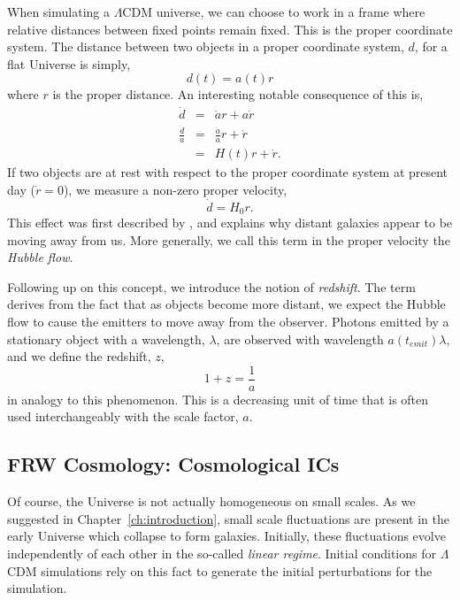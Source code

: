 When simulating a $\Lambda$CDM universe, we can choose to work in a frame where relative distances between fixed points remain fixed. This is the proper coordinate system. The distance between two objects in a proper coordinate system, $d$, for a flat Universe is simply,
\begin{equation}
d(t) = a(t) r \label{eq:comoving_dist}
\end{equation}
where $r$ is the proper distance. An interesting notable consequence of this is,
\begin{eqnarray}
\dot{d} &=& \dot{a} r + a \dot{r} \\
\frac{\dot{d}}{a} &=&  \frac{\dot{a}}{a} r + \dot{r} \\
&=& H(t) r + \dot{r}.
\end{eqnarray}
If two objects are at rest with respect to the proper coordinate system at present day ($\dot{r} = 0$), we measure a non-zero proper velocity,
\begin{equation}
\dot{d} = H_0 r.
\end{equation}
This effect was first described by \citet{hubble_1929}, and explains why distant galaxies appear to be moving away from us. More generally, we call this term in the proper velocity the \textit{Hubble flow}.




Following up on this concept, we introduce the notion of \textit{redshift}. The term derives from the fact that as objects become more distant, we expect the Hubble flow to cause the emitters to move away from the observer. Photons emitted by a stationary object with a wavelength, $\lambda$, are observed with wavelength $a(t_{emit}) \lambda$, and we define the redshift, $z$,
\begin{equation}
1 + z = \frac{1}{a}
\end{equation}
in analogy to this phenomenon. This is a decreasing unit of time that is often used interchangeably with the scale factor, $a$.
\subsection{FRW Cosmology: Cosmological ICs}

Of course, the Universe is not actually homogeneous on small scales. As we suggested in Chapter~\ref{ch:introduction}, small scale fluctuations are present in the early Universe which collapse to form galaxies. Initially, these fluctuations evolve independently of each other in the so-called \textit{linear regime}. Initial conditions for $\Lambda$CDM simulations rely on this fact to generate the initial perturbations for the simulation.


